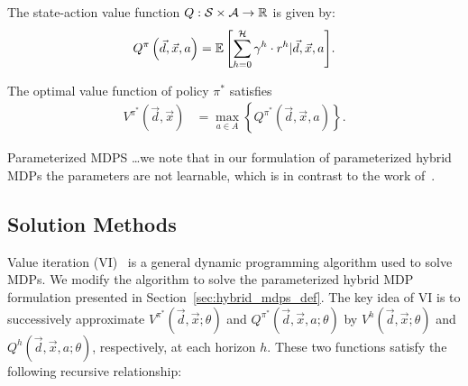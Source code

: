 The state-action value function $Q : \mathcal{S} \times \mathcal{A} \rightarrow \mathbb{R}$ is given by:
{\footnotesize 
    \abovedisplayskip=0pt
    \belowdisplayskip=0pt
\begin{align*}
    Q^{\pi}\left(\vec{d}, \vec{x}, a\right) = {\mathbb{E}\left[{\sum\limits_{h = 0}^{\mathcal{H}} \gamma^h \cdot r^h | \vec{d}, \vec{x}, a}\right]}.
\end{align*}
}

The optimal value function of policy $ \pi^{*} $ satisfies
{\footnotesize 
\abovedisplayskip=0pt
\belowdisplayskip=0pt
\begin{align}
    \label{eq:opt_vfunc}
    V^{\pi^{*}}(\vec{d}, \vec{x}) &= \max_{a \in A} \left\{ Q^{\pi^{*}}(\vec{d}, \vec{x}, a) \right\}. 
\end{align}
}%

%

Parameterized MDPS \ldots we note that in our formulation of parameterized hybrid MDPs the parameters are not learnable, which is in contrast to the work of~\parencite{Dearden_UAI_1999}. 


\subsection{Solution Methods}

Value iteration (VI)~\parencite{Bellman_PU_1957} is a general dynamic programming algorithm used to solve MDPs. We modify the algorithm to solve the parameterized hybrid MDP formulation presented in Section~\ref{sec:hybrid_mdps_def}. The key idea of VI is to successively approximate {\footnotesize $V^{\pi^{*}}(\vec{d}, \vec{x}; \theta)$} and {\footnotesize $Q^{\pi^{*}}(\vec{d}, \vec{x}, a; \theta)$}
by {\footnotesize $V^{h}(\vec{d}, \vec{x}; \theta)$} and {\footnotesize $Q^{h}(\vec{d}, \vec{x}, a; \theta)$}, respectively, at each horizon $h$. These two functions satisfy the following recursive relationship:

